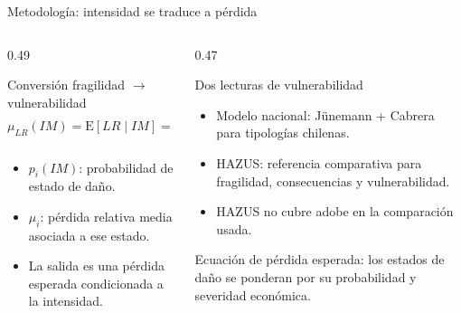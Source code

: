 \documentclass[aspectratio=169,10pt]{beamer}
\newcommand{\tightlist}{\setlength{\itemsep}{0.28em}}
\newcommand{\notecaption}[1]{%
  \vspace{0.16em}
  {\scriptsize\color{captiongray}\begin{minipage}{\linewidth}\centering #1\end{minipage}\par}
}
\begin{document}
\begin{frame}[t]{Metodología: intensidad se traduce a pérdida}
\begin{columns}[T,onlytextwidth]
  \begin{column}{0.49\textwidth}
    \begin{block}{Conversión fragilidad \(\rightarrow\) vulnerabilidad}
    \[
      \mu_{LR}(IM)=\mathrm{E}[LR\mid IM]=\sum_{i=1}^{n} p_i(IM)\,\mu_i
    \]
    \end{block}
    \begin{itemize}\tightlist
      \item \(p_i(IM)\): probabilidad de estado de daño.
      \item \(\mu_i\): pérdida relativa media asociada a ese estado.
      \item La salida es una pérdida esperada condicionada a la intensidad.
    \end{itemize}
  \end{column}
  \begin{column}{0.47\textwidth}
    \begin{block}{Dos lecturas de vulnerabilidad}
      \begin{itemize}\tightlist
        \item Modelo nacional: Jünemann + Cabrera para tipologías chilenas.
        \item HAZUS: referencia comparativa para fragilidad, consecuencias y vulnerabilidad.
        \item HAZUS no cubre adobe en la comparación usada.
      \end{itemize}
    \end{block}
    \notecaption{Ecuación de pérdida esperada: los estados de daño se ponderan por su probabilidad y severidad económica.}
  \end{column}
\end{columns}
\end{frame}
\end{document}
